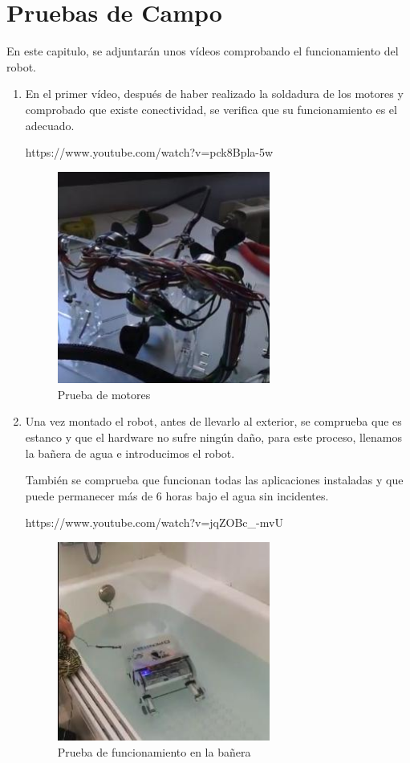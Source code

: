 \chapter{Pruebas de Campo}

En este capitulo, se adjuntarán unos vídeos comprobando el funcionamiento del robot.

\begin{enumerate}
\item En el primer vídeo, después de haber realizado la soldadura de los motores y comprobado que existe conectividad, se verifica que su funcionamiento es el adecuado.
 
https://www.youtube.com/watch?v=pck8Bpla-5w
 
 \begin{figure} [hbtp]
  \begin{center}
    \includegraphics[width=7cm]{img/cap5/motores}
  \end{center}
  \caption{Prueba de motores}
  \label{fig:motores}
 \end{figure}

\item Una vez montado el robot, antes de llevarlo al exterior, se comprueba que es estanco y que el hardware no sufre ningún daño, para este proceso, llenamos la bañera de agua e introducimos el robot.
 
También se comprueba que funcionan todas las aplicaciones instaladas y que puede permanecer más de 6 horas bajo el agua sin incidentes.

https://www.youtube.com/watch?v=jqZOBc\_-mvU
\newpage
 \begin{figure} [hbtp]
  \begin{center}
    \includegraphics[width=7cm]{img/cap5/banera}
  \end{center}
  \caption{Prueba de funcionamiento en la bañera}
  \label{fig:banera}
 \end{figure}
 

\end{enumerate}
